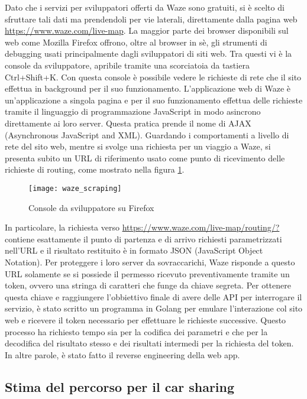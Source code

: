 Dato che i servizi per sviluppatori offerti da Waze sono gratuiti, si è scelto di sfruttare tali dati ma prendendoli per vie laterali, direttamente dalla pagina web \url{https://www.waze.com/live-map}. La maggior parte dei browser disponibili sul web come Mozilla Firefox offrono, oltre al browser in sè, gli strumenti di debugging usati principalmente dagli sviluppatori di siti web. Tra questi vi è la console da sviluppatore, apribile tramite una scorciatoia da tastiera Ctrl+Shift+K. Con questa console è possibile vedere le richieste di rete che il sito effettua in background per il suo funzionamento. L'applicazione web di Waze è un'applicazione a singola pagina e per il suo funzionamento effettua delle richieste tramite il linguaggio di programmazione JavaScript in modo asincrono direttamente ai loro server. Questa pratica prende il nome di AJAX (Asynchronous JavaScript and XML)\cite{ajaxwiki}. Guardando i comportamenti a livello di rete del sito web, mentre si svolge una richiesta per un viaggio a Waze, si presenta subito un URL di riferimento usato come punto di ricevimento delle richieste di routing, come mostrato nella figura \ref{image:1}.

\begin{figure}[H]
	\texttt{[image: waze\_scraping]}
	\caption{Console da sviluppatore su Firefox}
	\label{image:1}
\end{figure}

In particolare, la richiesta verso \url{https://www.waze.com/live-map/routing/?} contiene esattamente il punto di partenza e di arrivo richiesti parametrizzati nell'URL e il risultato restituito è in formato JSON (JavaScript Object Notation)\cite{wikijson}. Per proteggere i loro server da sovraccarichi, Waze risponde a questo URL solamente se si possiede il permesso ricevuto preventivamente tramite un token, ovvero una stringa di caratteri che funge da chiave segreta. Per ottenere questa chiave e raggiungere l'obbiettivo finale di avere delle API per interrogare il servizio, è stato scritto un programma in Golang per emulare l'interazione col sito web e ricevere il token necessario per effettuare le richieste successive. Questo processo ha richiesto tempo sia per la codifica dei parametri e che per la decodifica del risultato stesso e dei risultati intermedi per la richiesta del token. In altre parole, è stato fatto il reverse engineering della web app.

\subsection{Stima del percorso per il car sharing}

